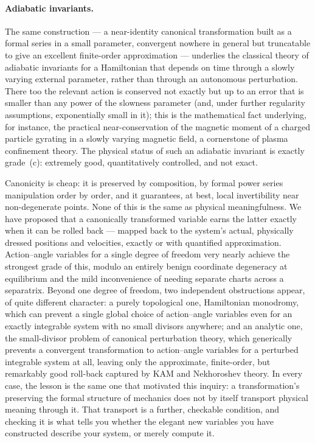 \paragraph{Adiabatic invariants.} The same construction --- a near-identity
canonical transformation built as a formal series in a small parameter,
convergent nowhere in general but truncatable to give an excellent finite-order
approximation --- underlies the classical theory of adiabatic invariants for a
Hamiltonian that depends on time through a slowly varying external parameter,
rather than through an autonomous perturbation. There too the relevant action
is conserved not exactly but up to an error that is smaller than any power of
the slowness parameter (and, under further regularity assumptions,
exponentially small in it); this is the mathematical fact
underlying, for instance, the practical near-conservation of the magnetic
moment of a charged particle gyrating in a slowly varying magnetic field, a
cornerstone of plasma confinement theory. The physical status of such an
adiabatic invariant is exactly grade~(c): extremely good, quantitatively
controlled, and not exact.

Canonicity is cheap: it is preserved by composition, by formal power series
manipulation order by order, and it guarantees, at best, local invertibility
near non-degenerate points. None of this is the same as physical
meaningfulness. We have proposed that a canonically transformed variable earns
the latter exactly when it can be rolled back --- mapped back to the system's
actual, physically dressed positions and velocities, exactly or with quantified
approximation. Action--angle variables for a single degree of freedom very
nearly achieve the strongest grade of this, modulo an entirely benign
coordinate degeneracy at equilibrium and the mild inconvenience of needing
separate charts across a separatrix. Beyond one degree of freedom, two
independent obstructions appear, of quite different character: a purely
topological one, Hamiltonian monodromy, which can prevent a single global
choice of action--angle variables even for an exactly integrable system with no
small divisors anywhere; and an analytic one, the small-divisor problem of
canonical perturbation theory, which generically prevents a convergent
transformation to action--angle variables for a perturbed integrable system at
all, leaving only the approximate, finite-order, but remarkably good roll-back
captured by KAM and Nekhoroshev theory. In every case, the lesson is the same
one that motivated this inquiry: a transformation's preserving the formal
structure of mechanics does not by itself transport physical meaning through
it. That transport is a further, checkable condition, and checking it is what
tells you whether the elegant new variables you have constructed describe your
system, or merely compute it.


